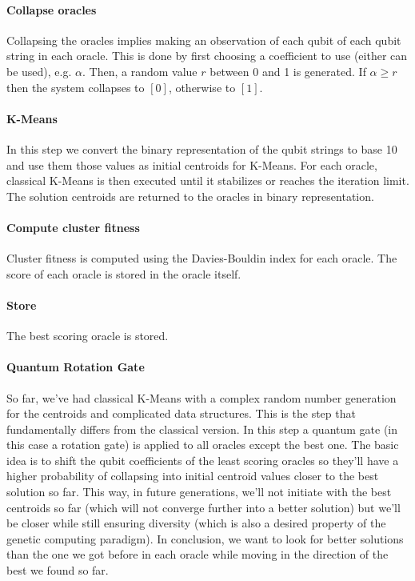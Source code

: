 \documentclass[10pt,a4paper,final]{article}
\begin{document}
\paragraph{Collapse oracles}

Collapsing the oracles implies making an observation of each qubit of each qubit string in each oracle. This is done by first choosing a coefficient to use (either can be used), e.g. $\alpha$. Then, a random value $r$ between 0 and 1 is generated. If $\alpha \ge r$ then the system collapses to $[0]$, otherwise to $[1]$.

\paragraph{K-Means}
In this step we convert the binary representation of the qubit strings to base 10 and use them those values as initial centroids for K-Means. For each oracle, classical K-Means is then executed until it stabilizes or reaches the iteration limit. The solution centroids are returned to the oracles in binary representation.

\paragraph{Compute cluster fitness}
Cluster fitness is computed using the Davies-Bouldin index for each oracle. The score of each oracle is stored in the oracle itself.

\paragraph{Store}
The best scoring oracle is stored.

\paragraph{Quantum Rotation Gate}
So far, we've had classical K-Means with a complex random number generation for the centroids and complicated data structures. This is the step that fundamentally differs from the classical version. In this step a quantum gate (in this case a rotation gate) is applied to all oracles except the best one. The basic idea is to shift the qubit coefficients of the least scoring oracles so they'll have a higher probability of collapsing into initial centroid values closer to the best solution so far. This way, in future generations, we'll not initiate with the best centroids so far (which will not converge further into a better solution) but we'll be closer while still ensuring diversity (which is also a desired property of the genetic computing paradigm). In conclusion, we want to look for better solutions than the one we got before in each oracle while moving in the direction of the best we found so far.
\end{document}
